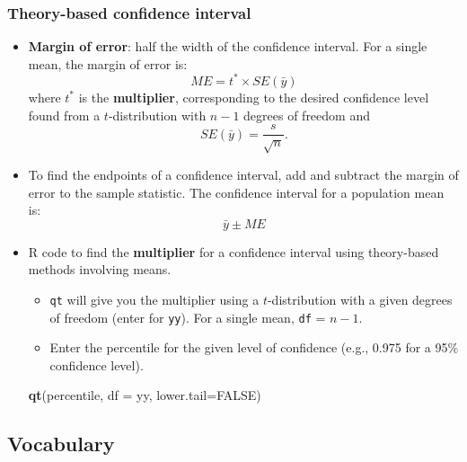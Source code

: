 \documentclass[
]{report}
\newenvironment{Shaded}{\begin{snugshade}}{\end{snugshade}}
\newcommand{\AttributeTok}[1]{\textcolor[rgb]{0.13,0.29,0.53}{#1}}
\newcommand{\ConstantTok}[1]{\textcolor[rgb]{0.56,0.35,0.01}{#1}}
\newcommand{\FunctionTok}[1]{\textcolor[rgb]{0.13,0.29,0.53}{\textbf{#1}}}
\newcommand{\NormalTok}[1]{#1}
\begin{document}
\subsubsection*{Theory-based confidence interval}\label{theory-based-confidence-interval}

\begin{itemize}
\item
  \textbf{Margin of error}: half the width of the confidence interval. For a single mean, the margin of error is:
  \[ME = t^* \times SE(\bar{y})\]
  where \(t^*\) is the \textbf{multiplier}, corresponding to the desired confidence level found from a \(t\)-distribution with \(n-1\) degrees of freedom and \[SE(\bar{y}) = \frac{s}{\sqrt{n}}.\]
\item
  To find the endpoints of a confidence interval, add and subtract the margin of error to the sample statistic. The confidence interval for a population mean is:
  \[\bar{y} \pm ME\]
\item
  R code to find the \textbf{multiplier} for a confidence interval using theory-based methods involving means.

  \begin{itemize}
  \item
    \texttt{qt} will give you the multiplier using a \(t\)-distribution with a given degrees of freedom (enter for \texttt{yy}). For a single mean, \texttt{df} = \(n - 1\).
  \item
    Enter the percentile for the given level of confidence (e.g., 0.975 for a 95\% confidence level).
  \end{itemize}

\begin{Shaded}
\begin{Highlighting}[]
\FunctionTok{qt}\NormalTok{(percentile, }\AttributeTok{df =}\NormalTok{ yy, }\AttributeTok{lower.tail=}\ConstantTok{FALSE}\NormalTok{)}
\end{Highlighting}
\end{Shaded}
\end{itemize}

\newpage

\subsection*{Vocabulary}\label{vocabulary-5}
\end{document}
